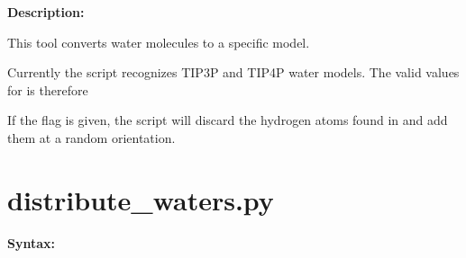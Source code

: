 \documentclass[letterpaper,10pt,english]{manual}
\begin{document}
\textbf{Description:}

This tool converts water molecules to a specific model.

Currently the script recognizes TIP3P and TIP4P water models. The valid values for  is therefore 

If the  flag is given, the script will discard the hydrogen atoms found in  and add them at a random orientation.


\section{distribute\_waters.py}

\textbf{Syntax:}

\end{document}
